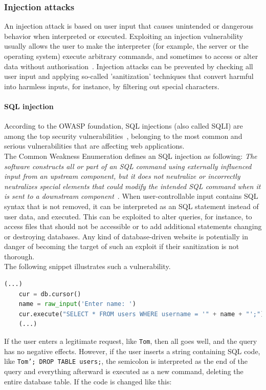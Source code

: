 \documentclass[
a4paper,
pagesize,
pdftex,
12pt,
ngerman,
fleqn,
final,
]{scrartcl}
\begin{document}
	\subsubsection{Injection attacks}
	An injection attack is based on user input that causes unintended or dangerous behavior when interpreted or executed. Exploiting an injection vulnerability usually allows the user to make the interpreter (for example, the server or the operating system) execute arbitrary commands, and sometimes to access or alter data without authorisation~\cite{Micheelsen.2016}. Injection attacks can be prevented by checking all user input and applying so-called 'sanitization' techniques that convert harmful into harmless inputs, for instance, by filtering out special characters. 
	\paragraph{SQL injection}
	According to the OWASP foundation, SQL injections (also called SQLI) are among the top security vulnerabilities~\cite{OWASPFoundation.}, belonging to the most common and serious vulnerabilities that are affecting web applications.\\ 
	The Common Weakness Enumeration defines an SQL injection as following: \textit{The software constructs all or part of an SQL command using externally influenced input from an upstream component, but it does not neutralize or incorrectly neutralizes special elements that could modify the intended SQL command when it is sent to a downstream component}~\cite{CommonWeaknessEnumeration.19.9.2019}. When user-controllable input contains SQL syntax that is not removed, it can be interpreted as an SQL statement instead of user data, and executed. This can be exploited to alter queries, for instance, to access files that should not be accessible or to add additional statements changing or destroying databases. Any kind of database-driven website is potentially in danger of becoming the target of such an exploit if their sanitization is not thorough.\\
	The following snippet illustrates such a vulnerability.
	\begin{lstlisting}[language=Python,showstringspaces=false]
	(...)
	cur = db.cursor()
	name = raw_input('Enter name: ')
	cur.execute("SELECT * FROM users WHERE username = '" + name + "';")
	(...)
	\end{lstlisting}
	If the user enters a legitimate request, like \texttt{Tom}, then all goes well, and the query has no negative effects. However, if the user inserts a string containing SQL code, like \texttt{Tom'; DROP TABLE users;}, the semicolon is interpreted as the end of the query and everything afterward is executed as a new command, deleting the entire database table. If the code is changed like this:
\end{document}
